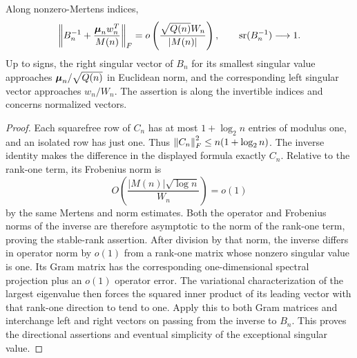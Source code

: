 \begin{corollary}\label{spec:inversefrob}
Along nonzero-Mertens indices,
\[
 \left\|B_n^{-1}+\frac{\boldsymbol{\mu}_nw_n^T}{M(n)}\right\|_F
   =o\left(\frac{\sqrt{Q(n)}W_n}{|M(n)|}\right),
 \qquad \operatorname{sr}(B_n^{-1})\longrightarrow1.
\]
Up to signs, the right singular vector of $B_n$ for its smallest singular value approaches $\boldsymbol{\mu}_n/\sqrt{Q(n)}$ in Euclidean norm, and the corresponding left singular vector approaches $w_n/W_n$. The assertion is along the invertible indices and concerns normalized vectors.
\end{corollary}
\begin{proof}
Each squarefree row of $C_n$ has at most $1+\log_2 n$ entries of modulus one, and an isolated row has just one. Thus $\left\lVert C_n\right\rVert_F^2\le n(1+\log_2 n)$. The inverse identity makes the difference in the displayed formula exactly $C_n$. Relative to the rank-one term, its Frobenius norm is
\[
 O\left(\frac{|M(n)|\sqrt{\log n}}{W_n}\right)=o(1)
\]
by the same Mertens and norm estimates. Both the operator and Frobenius norms of the inverse are therefore asymptotic to the norm of the rank-one term, proving the stable-rank assertion. After division by that norm, the inverse differs in operator norm by $o(1)$ from a rank-one matrix whose nonzero singular value is one. Its Gram matrix has the corresponding one-dimensional spectral projection plus an $o(1)$ operator error. The variational characterization of the largest eigenvalue then forces the squared inner product of its leading vector with that rank-one direction to tend to one. Apply this to both Gram matrices and interchange left and right vectors on passing from the inverse to $B_n$. This proves the directional assertions and eventual simplicity of the exceptional singular value.
\end{proof}
